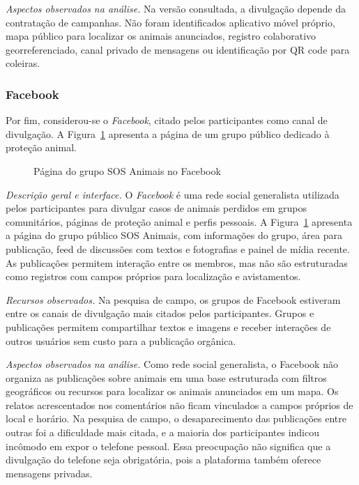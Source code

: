 \vspace{0.25cm}
\noindent \textit{Aspectos observados na análise.} Na versão consultada, a divulgação depende da contratação de campanhas. Não foram identificados aplicativo móvel próprio, mapa público para localizar os animais anunciados, registro colaborativo georreferenciado, canal privado de mensagens ou identificação por QR code para coleiras.


\subsubsection{Facebook}

Por fim, considerou-se o \textit{Facebook}, citado pelos participantes como canal de divulgação. A Figura~\ref{fig:facebook} apresenta a página de um grupo público dedicado à proteção animal.

\begin{figure}[H]
    \centering
    \caption{Página do grupo SOS Animais no Facebook}
    \label{fig:facebook}
\end{figure}

\noindent \textit{Descrição geral e interface.} O \textit{Facebook} é uma rede social generalista utilizada pelos participantes para divulgar casos de animais perdidos em grupos comunitários, páginas de proteção animal e perfis pessoais. A Figura~\ref{fig:facebook} apresenta a página do grupo público SOS Animais, com informações do grupo, área para publicação, feed de discussões com textos e fotografias e painel de mídia recente. As publicações permitem interação entre os membros, mas não são estruturadas como registros com campos próprios para localização e avistamentos.

\vspace{0.25cm}
\noindent \textit{Recursos observados.} Na pesquisa de campo, os grupos de Facebook estiveram entre os canais de divulgação mais citados pelos participantes. Grupos e publicações permitem compartilhar textos e imagens e receber interações de outros usuários sem custo para a publicação orgânica.

\vspace{0.25cm}
\noindent \textit{Aspectos observados na análise.} Como rede social generalista, o Facebook não organiza as publicações sobre animais em uma base estruturada com filtros geográficos ou recursos para localizar os animais anunciados em um mapa. Os relatos acrescentados nos comentários não ficam vinculados a campos próprios de local e horário. Na pesquisa de campo, o desaparecimento das publicações entre outras foi a dificuldade mais citada, e a maioria dos participantes indicou incômodo em expor o telefone pessoal. Essa preocupação não significa que a divulgação do telefone seja obrigatória, pois a plataforma também oferece mensagens privadas.

